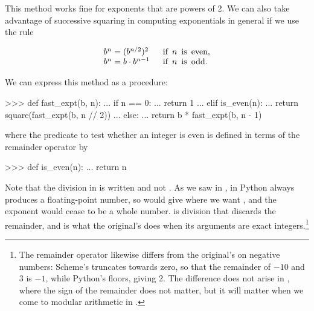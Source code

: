 This method works fine for exponents that are powers of 2.  We can also take
advantage of successive squaring in computing exponentials in general if we use
the rule

$$
\begin{array}{l@{{}={}}lr@{\ n\ }l}
  b^n & (b^{n / 2})^2  \;\; & \mbox{if\,} & \mbox{\,is\, even}, \\
  b^n & b\cdot b^{n-1} \;\; & \mbox{if\,} & \mbox{\,is\, odd}.
\end{array}
$$

We can express this method as a procedure:

\begin{codeBlock}
>>> def fast_expt(b, n):
...     if n == 0:
...         return 1
...     elif is_even(n):
...         return square(fast_expt(b, n // 2))
...     else:
...         return b * fast_expt(b, n - 1)
\end{codeBlock}

\noindent
where the predicate to test whether an integer is even is defined in terms of
the remainder operator \code{\%} by

\begin{codeBlock}
>>> def is_even(n):
...     return n %
\end{codeBlock}

\noindent
Note that the division in  is written \code{//} and not
\code{/}.  As we saw in , \code{/} in Python always
produces a floating-point number, so  would give  where
we want , and the exponent would cease to be a whole number.
\code{//} is division that discards the remainder, and is what the original's
\code{/} does when its arguments are exact integers.\footnote{The remainder
operator likewise differs from the original's  on negative
numbers: Scheme's truncates towards zero, so that the remainder of \( -10 \)
and 3 is \( -1 \), while Python's floors, giving 2.  The difference does not
arise in , where the sign of the remainder does not matter, but
it will matter when we come to modular arithmetic in
.}


